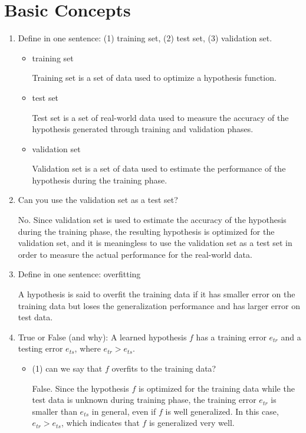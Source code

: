 \section{Basic Concepts}
\begin{enumerate}
\item Define in one sentence: (1) training set, (2) test set, (3) validation set.
\begin{itemize}
\item training set

Training set is a set of data used to optimize a hypothesis function.

\item test set

Test set is a set of real-world data used to measure the accuracy of the hypothesis generated through training and validation phases.

\item validation set

Validation set is a set of data used to estimate the performance of the hypothesis during the training phase.

\end{itemize}

\item Can you use the validation set as a test set?

No. Since validation set is used to estimate the accuracy of the hypothesis during the training phase, the resulting hypothesis is optimized for the validation set, and it is meaningless to use the validation set as a test set in order to measure the actual performance for the real-world data.

\item Define in one sentence: overfitting

A hypothesis is said to overfit the training data if it has smaller error on the training data but loses the generalization performance and has larger error on test data.

\item True or False (and why): A learned hypothesis $f$ has a training error $e_{tr}$ and a testing error $e_{ts}$, where $e_{tr} > e_{ts}$.

\begin{itemize}
\item (1) can we say that $f$ overfits to the training data?

False. Since the hypothesis $f$ is optimized for the training data while the test data is unknown during training phase, the training error $e_{tr}$ is smaller than $e_{ts}$ in general, even if $f$ is well generalized. In this case, $e_{tr} > e_{ts}$, which indicates that $f$ is generalized very well.


\end{itemize}
\end{enumerate}
